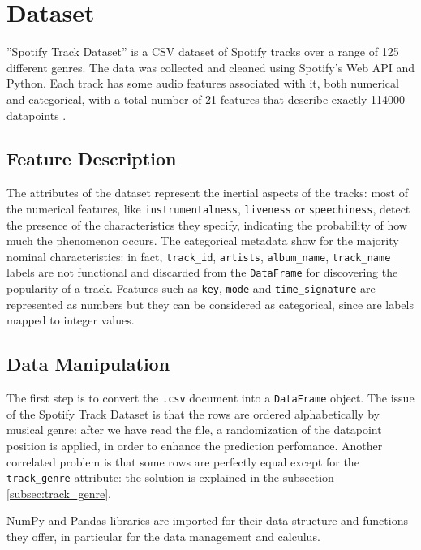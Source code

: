 \documentclass{article}
\begin{document}
    
\section{Dataset}
''Spotify Track Dataset'' is a CSV dataset of Spotify tracks over a range of 125 different genres. The data was collected and cleaned using Spotify's Web API and Python. Each track has some audio features associated with it, both numerical and categorical, with a total number of 21 features that describe exactly 114000 datapoints \cite{datasetKaggle}. 

\subsection{Feature Description}
\label{subsec:feature_descr}
The attributes of the dataset represent the inertial aspects of the tracks: most of the numerical features, like \texttt{instrumentalness}, \texttt{liveness} or \texttt{speechiness}, detect the presence of the characteristics they specify, indicating the probability of how much the phenomenon occurs. 
The categorical metadata show for the majority nominal characteristics: in fact, \texttt{track\_id}, \texttt{artists}, \texttt{album\_name}, \texttt{track\_name} labels are not functional and discarded from the \texttt{DataFrame} for discovering the popularity of a track. Features such as \texttt{key}, \texttt{mode} and \texttt{time\_signature} are represented as numbers but they can be considered as categorical, since are labels mapped to integer values.  

\subsection{Data Manipulation}
\label{subsec:dataman}    
The first step is to convert the \texttt{.csv} document into a \texttt{DataFrame} object. 
The issue of the Spotify Track Dataset is that the rows are ordered alphabetically by musical genre: after we have read the file, a randomization of the datapoint position is applied, in order to enhance the prediction perfomance. Another correlated problem is that some rows are perfectly equal except for the \texttt{track\_genre} attribute: the solution is explained in the subsection \ref{subsec:track_genre}. 
    
NumPy and Pandas libraries are imported for  their data structure and functions they offer, in particular for the data management and calculus.
    
\end{document}
